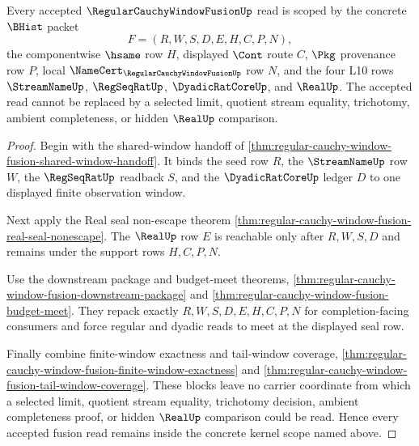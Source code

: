 \begin{theorem}
\label{thm:regular-cauchy-window-fusion-kernel-scope}
Every accepted $\RegularCauchyWindowFusionUp$ read is scoped by the concrete $\BHist$ packet
$$
F=(R,W,S,D,E,H,C,P,N),
$$
the componentwise $\hsame$ row $H$, displayed $\Cont$ route $C$, $\Pkg$ provenance row $P$, local $\NameCert_{\RegularCauchyWindowFusionUp}$ row $N$, and the four L10 rows $\StreamNameUp$, $\RegSeqRatUp$, $\DyadicRatCoreUp$, and $\RealUp$. The accepted read cannot be replaced by a selected limit, quotient stream equality, trichotomy, ambient completeness, or hidden $\RealUp$ comparison.
\end{theorem}
\begin{proof}
Begin with the shared-window handoff of \autoref{thm:regular-cauchy-window-fusion-shared-window-handoff}. It binds the seed row $R$, the $\StreamNameUp$ row $W$, the $\RegSeqRatUp$ readback $S$, and the $\DyadicRatCoreUp$ ledger $D$ to one displayed finite observation window.

Next apply the Real seal non-escape theorem \autoref{thm:regular-cauchy-window-fusion-real-seal-nonescape}. The $\RealUp$ row $E$ is reachable only after $R,W,S,D$ and remains under the support rows $H,C,P,N$.

Use the downstream package and budget-meet theorems, \autoref{thm:regular-cauchy-window-fusion-downstream-package} and \autoref{thm:regular-cauchy-window-fusion-budget-meet}. They repack exactly $R,W,S,D,E,H,C,P,N$ for completion-facing consumers and force regular and dyadic reads to meet at the displayed seal row.

Finally combine finite-window exactness and tail-window coverage, \autoref{thm:regular-cauchy-window-fusion-finite-window-exactness} and \autoref{thm:regular-cauchy-window-fusion-tail-window-coverage}. These blocks leave no carrier coordinate from which a selected limit, quotient stream equality, trichotomy decision, ambient completeness proof, or hidden $\RealUp$ comparison could be read. Hence every accepted fusion read remains inside the concrete kernel scope named above.
\end{proof}

